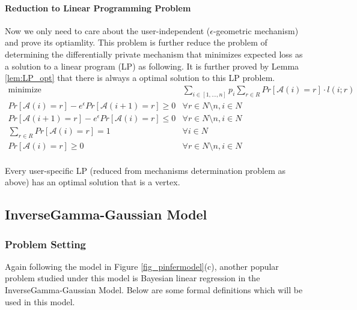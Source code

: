 \documentclass{article}
\begin{document}
\paragraph{Reduction to Linear Programming Problem}
Now we only need to care about the user-independent ($\epsilon$-geometric mechanism) and prove its optiamlity. 
This problem is further reduce
the problem of determining the differentially private mechanism that minimizes expected loss
as a solution to a linear program (LP) as following. It is further proved by Lemma \ref{lem:LP_opt} that there is always a optimal solution to this LP problem.
%
\[
    \begin{array}{rl}
    \mbox{minimize} 
    & \sum_{i \in [1,\ldots, n]}p_i \sum_{r \in R}
    Pr[\mathcal{A}(i) = r] \cdot l(i;r)\\
    Pr[\mathcal{A}(i) = r]  
    - e^{\epsilon}Pr[\mathcal{A}(i + 1) = r] \geq 0
    & \forall r \in N \setminus {n}, i \in N\\
    Pr[\mathcal{A}(i + 1) = r]  
    - e^{\epsilon}Pr[\mathcal{A}(i) = r] \leq 0
    & \forall r \in N \setminus {n}, i \in N\\
    \sum_{r \in R}
    Pr[\mathcal{A}(i) = r] = 1
    & \forall i \in N\\
    Pr[\mathcal{A}(i) = r] \geq 0
    & \forall r \in N \setminus {n}, i \in N\\    
    \end{array}
\]
%
\begin{lem}
\label{lem:LP_opt}
Every user-specific LP (reduced from mechanisms determination problem as above) has an optimal solution that is a vertex.
\end{lem}

\subsection{InverseGamma-Gaussian Model
\texorpdfstring{\cite{bernstein2019differentially}}{}}
%
\subsubsection{Problem Setting}
%
Again following the model in Figure \ref{fig_pinfermodel}(c), another popular problem studied under this model is Bayesian linear regression in the InverseGamma-Gaussian Model. 
%
Below are some formal definitions which will be used in this model.
\end{document}
